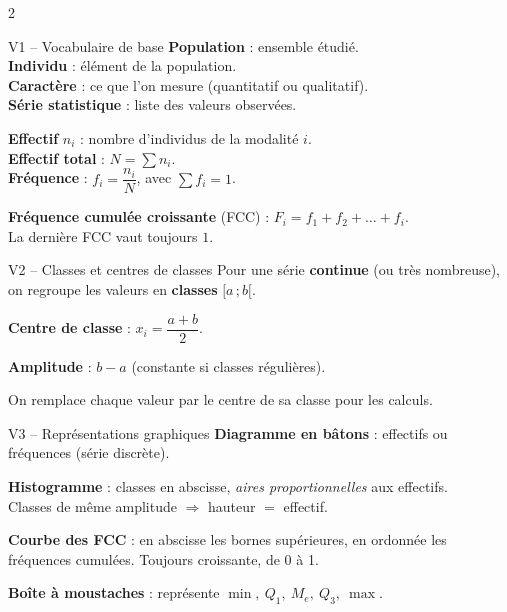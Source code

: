 \documentclass[11pt,a4paper]{article}
\begin{document}
\vspace{0.3cm}

\begin{multicols}{2}

\begin{vignetteCours}{V1 -- Vocabulaire de base}
\textbf{Population} : ensemble étudié.\\
\textbf{Individu} : élément de la population.\\
\textbf{Caractère} : ce que l'on mesure (quantitatif ou qualitatif).\\
\textbf{Série statistique} : liste des valeurs observées.

\medskip
\textbf{Effectif} $n_i$ : nombre d'individus de la modalité $i$.\\
\textbf{Effectif total} : $N = \sum n_i$.\\
\textbf{Fréquence} : $f_i = \dfrac{n_i}{N}$, avec $\sum f_i = 1$.

\medskip
\textbf{Fréquence cumulée croissante} (FCC) : $F_i = f_1+f_2+\dots+f_i$.\\
La dernière FCC vaut toujours $1$.
\end{vignetteCours}

\begin{vignetteCours}{V2 -- Classes et centres de classes}
Pour une série \textbf{continue} (ou très nombreuse), on regroupe les valeurs en \textbf{classes} $[a\,;b[$.

\medskip
\textbf{Centre de classe} : $x_i = \dfrac{a+b}{2}$.

\medskip
\textbf{Amplitude} : $b-a$ (constante si classes régulières).

\medskip
On remplace chaque valeur par le centre de sa classe pour les calculs.
\end{vignetteCours}

\begin{vignetteCours}{V3 -- Représentations graphiques}
\textbf{Diagramme en bâtons} : effectifs ou fréquences (série discrète).

\medskip
\textbf{Histogramme} : classes en abscisse, \emph{aires proportionnelles} aux effectifs.\\
Classes de même amplitude $\Rightarrow$ hauteur $=$ effectif.

\medskip
\textbf{Courbe des FCC} : en abscisse les bornes supérieures, en ordonnée les fréquences cumulées. Toujours croissante, de 0 à 1.

\medskip
\textbf{Boîte à moustaches} : représente $\min,\ Q_1,\ M_e,\ Q_3,\ \max$.
\end{vignetteCours}


\end{multicols}
\end{document}
